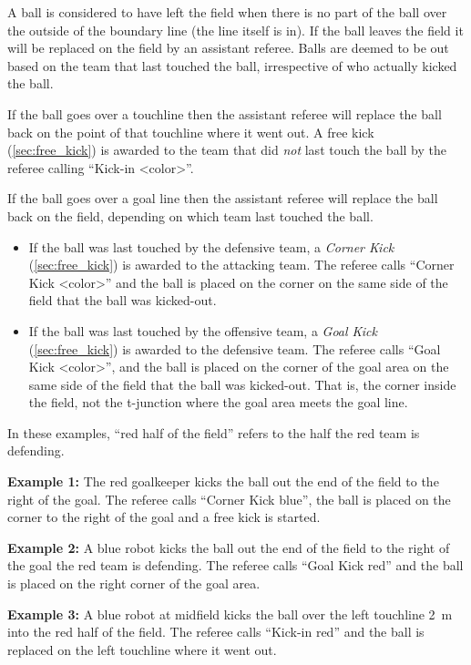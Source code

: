 A ball is considered to have left the field when there is no part of the ball over the outside of the boundary line (\ie the line itself is in). If the ball leaves the field it will be replaced on the field by an assistant referee. Balls are deemed to be out based on the team that last touched the ball, irrespective of who actually kicked the ball.

If the ball goes over a touchline then the assistant referee will replace the ball back on the point of that touchline where it went out. A free kick (\cf \cref{sec:free_kick}) is awarded to the team that did \emph{not} last touch the ball by the referee calling ``Kick-in \textless color\textgreater''.

If the ball goes over a goal line then the assistant referee will replace the ball back on the field, depending on which team last touched the ball.

\begin{itemize}
  \item If the ball was last touched by the defensive team, a \emph{Corner Kick} (\cf \cref{sec:free_kick}) is awarded to the attacking team. The referee calls ``Corner Kick \textless color\textgreater'' and the ball is placed on the corner on the same side of the field that the ball was kicked-out.
  \item If the ball was last touched by the offensive team, a \emph{Goal Kick} (\cf \cref{sec:free_kick}) is awarded to the defensive team. The referee calls ``Goal Kick \textless color\textgreater'', and the ball is placed on the corner of the goal area on the same side of the field that the ball was kicked-out. That is, the corner inside the field, not the t-junction where the goal area meets the goal line.
\end{itemize}

In these examples, ``red half of the field'' refers to the half the red team is defending.

  \textbf{Example 1:} The red goalkeeper kicks the ball out the end of the field to the right of the goal. The referee calls ``Corner Kick blue'', the ball is placed on the corner to the right of the goal and a free kick is started.

  \textbf{Example 2:} A blue robot kicks the ball out the end of the field to the right of the goal the red team is defending. The referee calls ``Goal Kick red'' and the ball is placed on the right corner of the goal area.

  \textbf{Example 3:} A blue robot at midfield kicks the ball over the left touchline \qty{2}{\metre} into the red half of the field. The referee calls ``Kick-in red'' and the ball is replaced on the left touchline where it went out.

